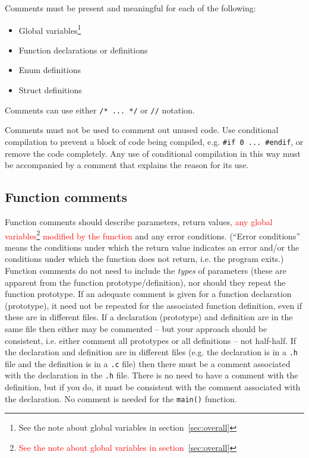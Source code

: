 \documentclass{article}
\begin{document}
Comments must be present and meaningful for each of the following:
\begin{itemize}
\itemsep 0em
    \item Global variables\footnote{See the note about global variables in section~\ref{sec:overall}}
    \item Function declarations or definitions
    \item Enum definitions
    \item Struct definitions
\end{itemize}

Comments can use either \texttt{/* ... */} or \texttt{//} notation.

Comments must not be used to comment out unused code. Use conditional compilation to prevent a block of
code being compiled, e.g. \texttt{\#if 0 ... \#endif}, or remove the code completely. Any use of conditional compilation in
this way must be accompanied by a comment that explains the reason for its use.

\subsection{Function comments}
Function comments should describe parameters, return values\textcolor{red}{, any global variables\footnote{\textcolor{red}{See the note about global variables in section~\ref{sec:overall}}} modified by the function} and any error conditions. (``Error conditions'' means
the conditions under which the return value indicates an error and/or the conditions under which the 
function does not return, i.e. the program exits.)
Function comments do not need to include the \textit{types} of parameters (these are apparent from the function prototype/definition), 
nor should they repeat the function prototype. If an adequate comment is given for a function 
declaration (prototype), it need not be repeated for the associated function definition, even if these are in 
different files. If a declaration (prototype) and
definition are in the same file then either may be commented -- but your approach should be consistent, i.e. either comment
all prototypes or all definitions -- not half-half. If the declaration and definition are in different files
(e.g. the declaration is in a \texttt{.h} file and the definition is in a \texttt{.c} file) then there must be a comment
associated with the declaration in the \texttt{.h} file. There is no need to have a comment with the definition, 
but if you do, it must be consistent with the comment associated with the declaration.
No comment is needed for the \texttt{main()} function.
\end{document}
